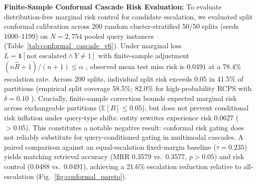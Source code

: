 \textbf{Finite-Sample Conformal Cascade Risk Evaluation:}
To evaluate distribution-free marginal risk control for candidate escalation, we evaluated split conformal calibration across 200 random cluster-stratified 50/50 splits (seeds 1000--1199) on $N=2{,}754$ pooled query instances (Table~\ref{tab:conformal_cascade_v6}). Under marginal loss $L = \mathbf{1}[\text{not escalated} \land Y \ne 1]$ with finite-sample adjustment $(n\hat{R}+1)/(n+1) \le \alpha$ \cite{bates2021conformal, angelopoulos2021gentle}, observed mean test miss risk is $0.0491$ at a $78.4\%$ escalation rate. Across 200 splits, individual split risk exceeds 0.05 in 41.5\% of partitions (empirical split coverage 58.5\%; 82.0\% for high-probability RCPS with $\delta=0.10$ \cite{bates2021conformal}). Crucially, finite-sample correction bounds expected marginal risk across exchangeable partitions ($\mathbb{E}[R] \le 0.05$), but does not prevent conditional risk inflation under query-type shifts: entity rewrites experience risk 0.0627 ($>0.05$). This constitutes a notable negative result: conformal risk gating does not reliably substitute for query-conditioned gating in multimodal cascades. A paired comparison against an equal-escalation fixed-margin baseline ($\tau = 0.235$) yields matching retrieval accuracy (MRR 0.3579 vs.\ 0.3577, $p > 0.05$) and risk control (0.0488 vs.\ 0.0491), achieving a 21.6\% escalation reduction relative to all-escalation (Fig.~\ref{fig:conformal_pareto}).

